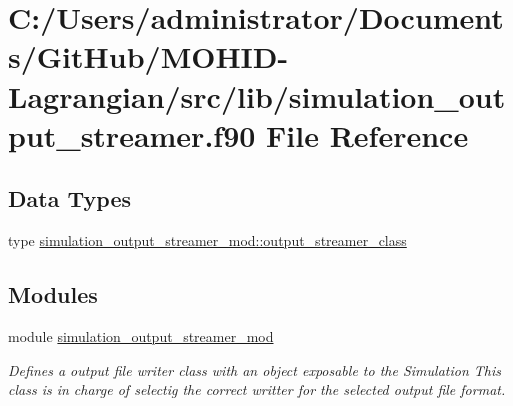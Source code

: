 \hypertarget{simulation__output__streamer_8f90}{}\section{C\+:/\+Users/administrator/\+Documents/\+Git\+Hub/\+M\+O\+H\+I\+D-\/\+Lagrangian/src/lib/simulation\+\_\+output\+\_\+streamer.f90 File Reference}
\label{simulation__output__streamer_8f90}
\subsection*{Data Types}
\begin{DoxyCompactItemize}
\item 
type \mbox{\hyperlink{structsimulation__output__streamer__mod_1_1output__streamer__class}{simulation\+\_\+output\+\_\+streamer\+\_\+mod\+::output\+\_\+streamer\+\_\+class}}
\end{DoxyCompactItemize}
\subsection*{Modules}
\begin{DoxyCompactItemize}
\item 
module \mbox{\hyperlink{namespacesimulation__output__streamer__mod}{simulation\+\_\+output\+\_\+streamer\+\_\+mod}}
\begin{DoxyCompactList}\small\item\em Defines a output file writer class with an object exposable to the Simulation This class is in charge of selectig the correct writter for the selected output file format. \end{DoxyCompactList}\end{DoxyCompactItemize}

